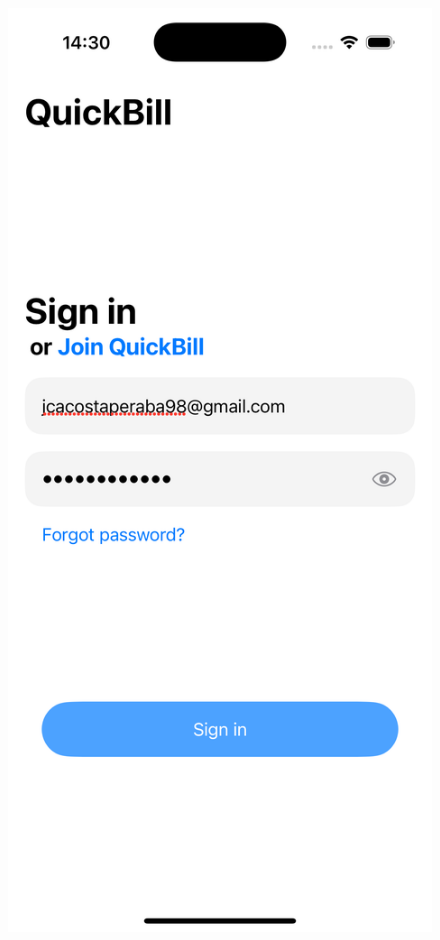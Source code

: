 \begin{large}
\begin{figure}[H]
  \centering
  \begin{minipage}[t]{0.45\textwidth}
    \centering
    \includegraphics[width=\linewidth]{Ilustraciones/ios_sign_in.png}

\end{minipage}
\end{figure}
\end{large}
